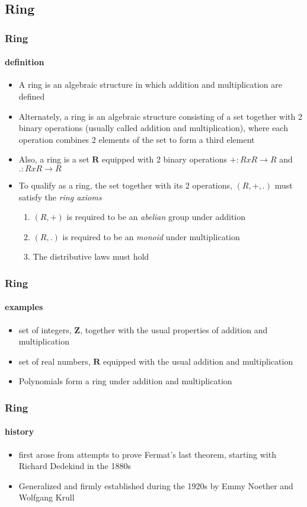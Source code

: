 \subsection{Ring}
\begin{frame}
\frametitle{Ring}
\framesubtitle{definition}
\logoCSIPCPL\mypagenum\mypagenum
	\begin{itemize} 
		\item A ring is an algebraic structure in which addition and multiplication are defined
		\item Alternately, a ring is an algebraic structure consisting of a set together with 2 binary operations (usually called addition and multiplication), where each operation combines 2 elements of the set to form a third element
		\item Also, a ring is a set $\mathbf{R}$ equipped with 2 binary operations $+:RxR \rightarrow R$ and $.: RxR \rightarrow R$
		\item To qualify as a ring, the set together with its 2 operations, $(R, +, .)$ must satisfy the 
\emph{ring axioms}
		\begin{enumerate}
			\item $(R, +)$ is required to be an \emph{abelian} group under addition
			\item $(R, .)$ is required to be an \emph{monoid} under multiplication
			\item The distributive laws must hold
		\end{enumerate}
	\end{itemize}
\end{frame}




\begin{frame}
\frametitle{Ring}
\framesubtitle{examples}
\logoCSIPCPL\mypagenum\mypagenum
	\begin{itemize} 
		\item set of integers, $\mathbf{Z}$, together with the usual properties of addition and multiplication
		\item set of real numbers, $\mathbf{R}$ equipped with the usual addition and multiplication
		\item Polynomials form a ring under addition and multiplication
	\end{itemize}
\end{frame}


\begin{frame}
\frametitle{Ring}
\framesubtitle{history}
\logoCSIPCPL\mypagenum\mypagenum
	\begin{itemize} 
		\item first arose from attempts to prove Fermat's last theorem, starting with Richard Dedekind in the 1880s
		\item Generalized and firmly established during the 1920s by Emmy Noether and Wolfgang Krull
	\end{itemize}
\end{frame}




